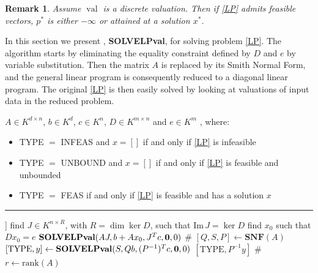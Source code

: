 \documentclass[sigconf]{acmart}
\newtheorem{remark}[theorem]{Remark}
\DeclareMathOperator{\val}{val}
\begin{document}
\begin{remark}
  Assume $\val$ is a discrete valuation. Then
  if \eqref{LP} admits feasible vectors,
  $p^*$ is either $-\infty$ or attained at a solution $x^*$.
\end{remark}

In this section we present , \textbf{SOLVELPval}, for solving problem \eqref{LP}.
The algorithm starts by eliminating the equality constraint defined by $D$ and $e$
by variable substitution. Then the matrix $A$ is replaced by its Smith Normal Form,
and the general linear program is consequently reduced to a diagonal linear program.
The original \eqref{LP} is then easily solved by looking at valuations of input data
in the reduced problem.

\begin{algorithm}[!ht]
    \caption{\textbf{SOLVELPval}($A,b,c,D,e$)}\label{algo_LP}
    \begin{algorithmic}[1]
      \REQUIRE
      $A \in K^{d\times n}$, $b \in K^d$, $c \in K^n$, $D \in K^{m \times n}$ and $e \in K^m$
      \ENSURE [TYPE, $x$], where:
      \begin{itemize}
      \item[]
        TYPE $=$ INFEAS and $x=[]$ if and only if \eqref{LP} is infeasible
      \item[]
        TYPE $=$ UNBOUND and $x=[]$ if and only if \eqref{LP} is feasible and unbounded
      \item[]
        TYPE $=$ FEAS if and only if \eqref{LP} is feasible and has a solution $x$
      \end{itemize}
      \hrule
      \vspace{0.1cm}
      \RETURN [INFEAS, []] \label{step:linear_empty}
      \ENDIF
       \label{step:reducD:begin}
      \STATE find $J \in K^{n \times R}$, with $R = \dim\ker D$, such that $\text{Im}\, J = \ker D$
      \STATE find $x_0$ such that $Dx_0=e$ \label{step:reducD:end}
      \RETURN $\textbf{SOLVELPval}(AJ,b+A x_0,J^T c, {\bf 0},0)$ \label{step:reducD} \hfill {\color{olive} \# }
      \ENDIF
       \label{step:solsLP:begin}
      \STATE $[Q,S,P] \leftarrow \textbf{SNF}(A)$
      \STATE $[\mathrm{TYPE}, y] \leftarrow \textbf{SOLVELPval}(S,Qb,(P^{-1})^Tc,{\bf 0},0)$ \label{step:solsLP:end}
      \RETURN $[\mathrm{TYPE}, P^{-1}y]$ \hfill \color{olive} \#  \label{step:solsLP}
      \ENDIF
      \STATE $r \leftarrow \text{rank}(A)$

\end{algorithmic}
\end{algorithm}
\end{document}
